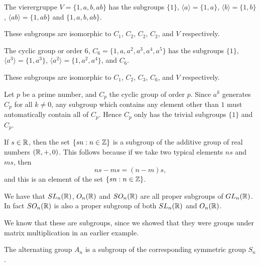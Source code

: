 \begin{example}\label{eg:4groupsubgroups}
  The vierergruppe $V = \{1, a, b, ab\}$ has the subgroups $\{1\}$,
  $\langle a \rangle = \{1, a\}$, $\langle b \rangle = \{1, b\}$,
  $\langle ab \rangle = \{1, ab\}$ and $\{1, a, b, ab\}$.
  
  These subgroups are isomorphic to $C_{1}$, $C_{2}$, $C_{2}$, $C_{2}$,
  and $V$ respectively.
\end{example}

\begin{example}\label{eg:C6subgroups}
  The cyclic group or order $6$, $C_{6} = \{1, a, a^{2}, a^{3}, a^{4}, a^{5}\}$
  has the subgroups $\{1\}$,
  $\langle a^{3} \rangle = \{1, a^{3}\}$,
  $\langle a^{2} \rangle = \{1, a^{2}, a^{4}\}$,
  and $C_{6}$.
  
  These subgroups are isomorphic to $C_{1}$, $C_{2}$, $C_{3}$, $C_{6}$,
  and $V$ respectively.
\end{example}

\begin{example}\label{eg:Cpsubgroups}
  Let $p$ be a prime number, and $C_{p}$ the cyclic group of order $p$.
  Since $a^{k}$ generates $C_{p}$ for all $k \ne 0$, any subgroup which
  contains any element other than $1$ must automatically contain all of
  $C_{p}$.  Hence $C_{p}$ only has the trivial subgroups $\{1\}$ and $C_{p}$.
\end{example}

\begin{example}
  If $s \in \mathbb{R}$, then the set $\{sn : n \in \mathbb{Z}\}$ is a subgroup
  of the additive group of real numbers $(\mathbb{R}, +, 0)$.  This follows
  because if we take two typical elements $ns$ and $ms$, then
  \[
    ns - ms = (n-m)s,
  \]
  and this is an element of the set $\{sn : n \in \mathbb{Z}\}$.
\end{example}

\begin{example}
  We have that $SL_{n}(\mathbb{R})$, $O_{n}(\mathbb{R})$ and $SO_{n}(\mathbb{R})$ are all
  proper subgroups of $GL_{n}(\mathbb{R})$.  In fact $SO_{n}(\mathbb{R})$ is also a
  proper subgroup of both $SL_{n}(\mathbb{R})$ and $O_{n}(\mathbb{R})$.
  
  We know that these are subgroups, since we showed that they were groups
  under matrix multiplication in an earlier example.
\end{example}

\begin{example}
  The alternating group $A_{n}$ is a subgroup of the corresponding symmetric
  group $S_{n}$.
\end{example}

